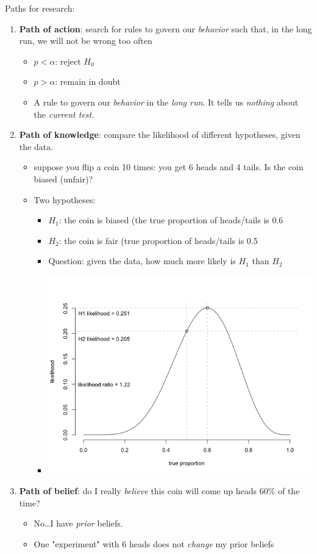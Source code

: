 \documentclass[11pt]{article}
\begin{document}
Paths for research:
\begin{enumerate}
\item \textbf{Path of action}: search for rules to govern our \emph{behavior} such that, in the long run, we will not be wrong too often
\begin{itemize}
\item $p < \alpha$: reject $H_0$
\item $p > \alpha$: remain in doubt
\item A rule to govern our \emph{behavior} in the \emph{long run}.  It tells us \emph{nothing} about the \emph{current test}.
\end{itemize}

\item \textbf{Path of knowledge}:  compare the likelihood of different hypotheses, given the data.
\begin{itemize}
\item suppose you flip a coin 10 times: you get 6 heads and 4 tails.  Is the coin biased (unfair)?
\item Two hypotheses: 
\begin{itemize}
\item $H_1$: the coin is biased (the true proportion of heads/tails is 0.6
\item $H_2$: the coin is fair (true proportion of heads/tails is 0.5
\item Question: given the data, how much more likely is $H_1$ than $H_2$
\item \includegraphics[width=.9\linewidth]{figures/coinFlip.png}
\end{itemize}
\end{itemize}

\item \textbf{Path of belief}: do I really \emph{believe} this coin will come up heads 60\% of the time?
\begin{itemize}
\item No\ldots{}I have \emph{prior} beliefs.
\item One "experiment" with 6 heads does not \emph{change} my prior beliefs
\end{itemize}
\end{enumerate}
\end{document}
